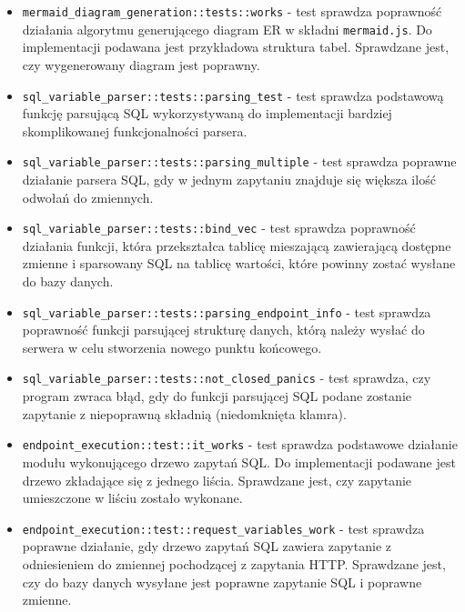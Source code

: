 \begin{itemize}

    \item \verb|mermaid_diagram_generation::tests::works| - test sprawdza
        poprawność działania algorytmu generującego diagram ER w składni
        \verb|mermaid.js|. Do implementacji podawana jest przykładowa struktura
        tabel. Sprawdzane jest, czy wygenerowany diagram jest poprawny.

    \item \verb|sql_variable_parser::tests::parsing_test| - test sprawdza
        podstawową funkcję parsującą SQL wykorzystywaną do implementacji
        bardziej skomplikowanej funkcjonalności parsera.

    \item \verb|sql_variable_parser::tests::parsing_multiple| - test sprawdza
        poprawne działanie parsera SQL, gdy w jednym zapytaniu znajduje się
        większa ilość odwołań do zmiennych.

    \item \verb|sql_variable_parser::tests::bind_vec| - test sprawdza poprawność
        działania funkcji, która przekształca tablicę mieszającą zawierającą
        dostępne zmienne i sparsowany SQL na tablicę wartości, które powinny
        zostać wysłane do bazy danych.

    \item \verb|sql_variable_parser::tests::parsing_endpoint_info| - test
        sprawdza poprawność funkcji parsującej strukturę danych, którą należy
        wysłać do serwera w celu stworzenia nowego punktu końcowego.

    \item \verb|sql_variable_parser::tests::not_closed_panics| - test sprawdza,
        czy program zwraca błąd, gdy do funkcji parsującej SQL podane zostanie
        zapytanie z niepoprawną składnią (niedomknięta klamra).

    \item \verb|endpoint_execution::test::it_works| - test sprawdza podstawowe
        działanie modułu wykonującego drzewo zapytań SQL. Do implementacji
        podawane jest drzewo zkładające się z jednego liścia. Sprawdzane jest,
        czy zapytanie umieszczone w liściu zostało wykonane.
        
    \item \verb|endpoint_execution::test::request_variables_work| - test
        sprawdza poprawne działanie, gdy drzewo zapytań SQL zawiera zapytanie z
        odniesieniem do zmiennej pochodzącej z zapytania HTTP. Sprawdzane jest,
        czy do bazy danych wysyłane jest poprawne zapytanie SQL i poprawne
        zmienne.


\end{itemize}
